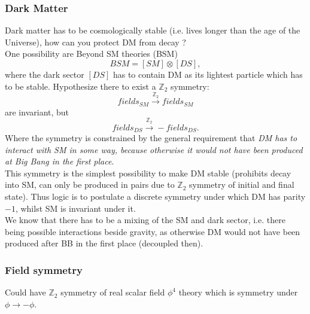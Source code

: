\subsubsection{Dark Matter}
Dark matter has to be cosmologically stable (i.e. lives longer than the age of the Universe), how can you protect DM from decay ?\\
One possibility are Beyond SM theories (BSM) 
\begin{equation*}
	BSM = [SM] \otimes [DS],
\end{equation*}
where the dark sector $[DS]$ has to contain DM as its lightest particle which has to be stable. Hypothesize there to exist a $\mathbb{Z}_2$ symmetry:
\begin{equation*}
	fields_{SM} \stackrel{\mathbb{Z}_2}{\rightarrow} fields_{SM}
\end{equation*}
are invariant, but 
\begin{equation*}
	fields_{DS} \stackrel{\mathbb{Z_2}}{\rightarrow} - fields_{DS}.
\end{equation*}
Where the symmetry is constrained by the general requirement that \emph{DM has to interact with SM in some way, because otherwise it would not have been produced at Big Bang in the first place}.\\
This symmetry is the simplest possibility to make DM stable (prohibits decay into SM, can only be produced in pairs due to $\mathbb{Z}_2$ symmetry of initial and final state). Thus logic is to postulate a discrete symmetry under which DM has parity $-1$, whilst SM is invariant under it.\\
 We know that there has to be a mixing of the SM and dark sector, i.e. there being possible interactions beside gravity, as otherwise DM would not have been produced after BB in the first place (decoupled then).
\subsubsection{Field symmetry}
Could have $\mathbb{Z}_2$ symmetry of real scalar field $\phi^4$ theory which is symmetry under $\phi \rightarrow - \phi$.
